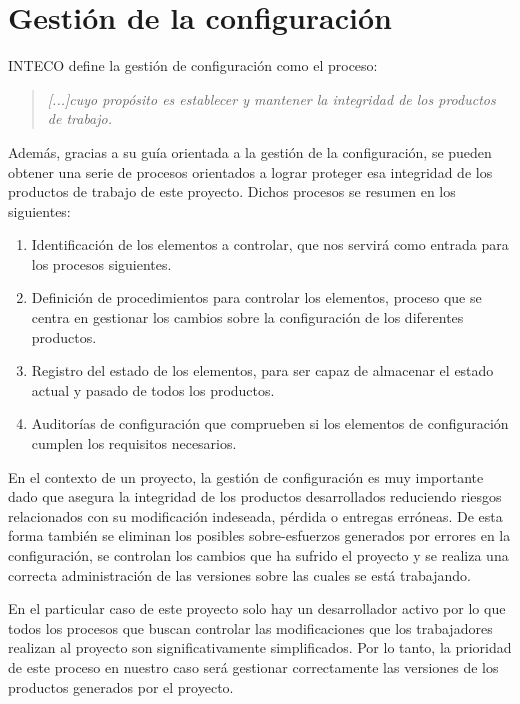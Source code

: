\clearpage

\section{Gestión de la configuración}

INTECO\cite{inteco} define la gestión de configuración como el proceso:

\begin{quote}
	\textit{
[...]cuyo propósito es establecer y mantener la integridad de los productos de trabajo.
}
\end{quote}

Además, gracias a su guía orientada a la gestión de la configuración, se pueden obtener una serie de procesos orientados a lograr proteger esa integridad de los productos de trabajo de este proyecto. Dichos procesos se resumen en los siguientes:

\begin{enumerate}
	\item Identificación de los elementos a controlar, que nos servirá como entrada para los procesos siguientes.
	\item Definición de procedimientos para controlar los elementos, proceso que se centra en gestionar los cambios sobre la configuración de los diferentes productos.
	\item Registro del estado de los elementos, para ser capaz de almacenar el estado actual y pasado de todos los productos.
	\item Auditorías de configuración que comprueben si los elementos de configuración cumplen los requisitos necesarios.
\end{enumerate}

\bigskip

En el contexto de un proyecto, la gestión de configuración es muy importante dado que asegura la integridad de los productos desarrollados reduciendo riesgos relacionados con su modificación indeseada, pérdida o entregas erróneas. De esta forma también se eliminan los posibles sobre-esfuerzos generados por errores en la configuración, se controlan los cambios que ha sufrido el proyecto y se realiza una correcta administración de las versiones sobre las cuales se está trabajando.

\bigskip

En el particular caso de este proyecto solo hay un desarrollador activo por lo que todos los procesos que buscan controlar las modificaciones que los trabajadores realizan al proyecto son significativamente simplificados. Por lo tanto, la prioridad de este proceso en nuestro caso será gestionar correctamente las versiones de los productos generados por el proyecto.

